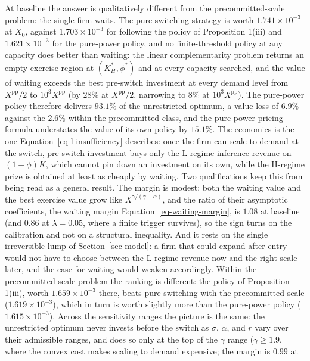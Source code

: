 \documentclass[
  11pt,
  letterpaper,
]{scrartcl}
\begin{document}
At baseline the answer is qualitatively different from the
precommitted-scale problem: the single firm waits. The pure switching
strategy is worth \(1.741 \times 10^{-3}\) at \(X_0\), against
\(1.703 \times 10^{-3}\) for following the policy of Proposition 1(iii)
and \(1.621 \times 10^{-3}\) for the pure-power policy, and no
finite-threshold policy at any capacity does better than waiting: the
linear complementarity problem returns an empty exercise region at
\((K_H^*, \phi^*)\) and at every capacity searched, and the value of
waiting exceeds the best pre-switch investment at every demand level
from \(X^{\text{pp}}/2\) to \(10^3 X^{\text{pp}}\) (by \(28\%\) at
\(X^{\text{pp}}/2\), narrowing to \(8\%\) at \(10^3 X^{\text{pp}}\)).
The pure-power policy therefore delivers \(93.1\%\) of the unrestricted
optimum, a value loss of \(6.9\%\) against the \(2.6\%\) within the
precommitted class, and the pure-power pricing formula understates the
value of its own policy by \(15.1\%\). The economics is the one
Equation~\ref{eq-l-insufficiency} describes: once the firm can scale to
demand at the switch, pre-switch investment buys only the L-regime
inference revenue on \((1-\phi)K\), which cannot pin down an investment
on its own, while the H-regime prize is obtained at least as cheaply by
waiting. Two qualifications keep this from being read as a general
result. The margin is modest: both the waiting value and the best
exercise value grow like \(X^{\gamma/(\gamma-\alpha)}\), and the ratio
of their asymptotic coefficients, the waiting margin
Equation~\ref{eq-waiting-margin}, is \(1.08\) at baseline (and \(0.86\)
at \(\lambda = 0.05\), where a finite trigger survives), so the sign
turns on the calibration and not on a structural inequality. And it
rests on the single irreversible lump of Section~\ref{sec-model}: a firm
that could expand after entry would not have to choose between the
L-regime revenue now and the right scale later, and the case for waiting
would weaken accordingly. Within the precommitted-scale problem the
ranking is different: the policy of Proposition 1(iii), worth
\(1.659 \times 10^{-3}\) there, beats pure switching with the
precommitted scale (\(1.619 \times 10^{-3}\)), which in turn is worth
slightly more than the pure-power policy (\(1.615 \times 10^{-3}\)).
Across the sensitivity ranges the picture is the same: the unrestricted
optimum never invests before the switch as \(\sigma\), \(\alpha\), and
\(r\) vary over their admissible ranges, and does so only at the top of
the \(\gamma\) range (\(\gamma \geq 1.9\), where the convex cost makes
scaling to demand expensive; the margin is \(0.99\) at
\end{document}
